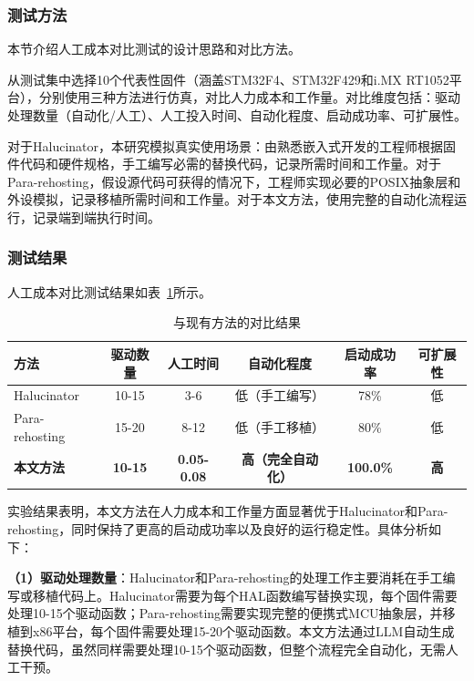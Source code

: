\subsubsection{测试方法}

本节介绍人工成本对比测试的设计思路和对比方法。

从测试集中选择10个代表性固件（涵盖STM32F4、STM32F429和i.MX RT1052平台），分别使用三种方法进行仿真，对比人力成本和工作量。对比维度包括：驱动处理数量（自动化/人工）、人工投入时间、自动化程度、启动成功率、可扩展性。

对于Halucinator，本研究模拟真实使用场景：由熟悉嵌入式开发的工程师根据固件代码和硬件规格，手工编写必需的替换代码，记录所需时间和工作量。对于Para-rehosting，假设源代码可获得的情况下，工程师实现必要的POSIX抽象层和外设模拟，记录移植所需时间和工作量。对于本文方法，使用完整的自动化流程运行，记录端到端执行时间。

\subsubsection{测试结果}

人工成本对比测试结果如表~\ref{tab:compare_results}所示。

\begin{table}[htbp]
\centering
\caption{与现有方法的对比结果}
\label{tab:compare_results}
\small
\begin{tabular}{lccccc}
\toprule
\textbf{方法} & \textbf{驱动数量} & \textbf{人工时间} & \textbf{自动化程度} & \textbf{启动成功率} & \textbf{可扩展性} \\
\midrule
Halucinator & 10-15 & 3-6 & 低（手工编写） & 78\% & 低 \\
Para-rehosting & 15-20 & 8-12 & 低（手工移植） & 80\% & 低 \\
\textbf{本文方法} & \textbf{10-15} & \textbf{0.05-0.08} & \textbf{高（完全自动化）} & \textbf{100.0\%} & \textbf{高} \\
\bottomrule
\end{tabular}
\end{table}

实验结果表明，本文方法在人力成本和工作量方面显著优于Halucinator和Para-rehosting，同时保持了更高的启动成功率以及良好的运行稳定性。具体分析如下：

\textbf{（1）驱动处理数量}：Halucinator和Para-rehosting的处理工作主要消耗在手工编写或移植代码上。Halucinator需要为每个HAL函数编写替换实现，每个固件需要处理10-15个驱动函数；Para-rehosting需要实现完整的便携式MCU抽象层，并移植到x86平台，每个固件需要处理15-20个驱动函数。本文方法通过LLM自动生成替换代码，虽然同样需要处理10-15个驱动函数，但整个流程完全自动化，无需人工干预。

